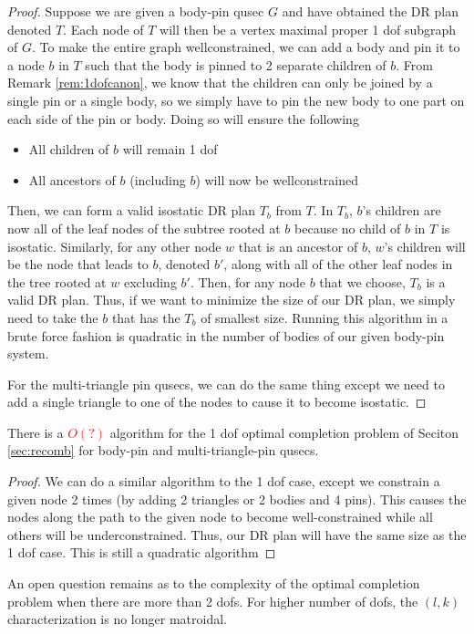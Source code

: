 \begin{proof}
    Suppose we are given a body-pin qusec $G$ and have obtained the DR plan denoted $T$. Each node of $T$ will then be a vertex maximal proper 1 dof subgraph of $G$. To make the entire graph wellconstrained, we can add a body and pin it to a node $b$ in $T$ such that the body is pinned to 2 separate children of $b$. From Remark \ref{rem:1dofcanon}, we know that the children can only be joined by a single pin or a single body, so we simply have to pin the new body to one part on each side of the pin or body. Doing so will ensure the following

    \begin{itemize}
        \item All children of $b$ will remain 1 dof
        \item All ancestors of $b$ (including $b$) will now be wellconstrained
    \end{itemize}

    Then, we can form a valid isostatic DR plan $T_b$ from $T$. In $T_b$, $b$'s children are now all of the leaf nodes of the subtree rooted at $b$ because no child of $b$ in $T$ is isostatic. Similarly, for any other node $w$ that is an ancestor of $b$, $w$'s children will be the node that leads to $b$, denoted $b'$, along with all of the other leaf nodes in the tree rooted at $w$ excluding $b'$. Then, for any node $b$ that we choose, $T_b$ is a valid DR plan. Thus, if we want to minimize the size of our DR plan, we simply need to take the $b$ that has the $T_b$ of smallest size. Running this algorithm in a brute force fashion is quadratic in the number of bodies of our given body-pin system.

    For the multi-triangle pin qusecs, we can do the same thing except we need to add a single triangle to one of the nodes to cause it to become isostatic.

\end{proof}

\begin{theorem}
    There is a \textcolor{red}{$O(?)$} algorithm for the 1 dof optimal completion problem of Seciton \ref{sec:recomb} for body-pin and multi-triangle-pin qusecs.
\end{theorem}

\begin{proof}
    We can do a similar algorithm to the 1 dof case, except we constrain a given node 2 times (by adding 2 triangles or 2 bodies and 4 pins). This causes the nodes along the path to the given node to become well-constrained while all others will be underconstrained. Thus, our DR plan will have the same size as the 1 dof case. This is still a quadratic algorithm
\end{proof}

An open question remains as to the complexity of the optimal completion problem when there are more than 2 dofs. For higher number of dofs, the $(l,k)$ characterization is no longer matroidal.
